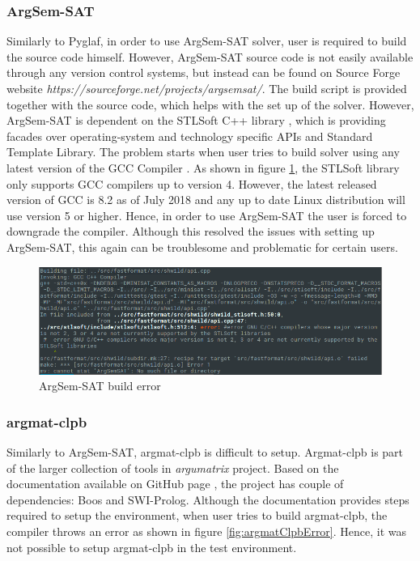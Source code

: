 \subsubsection{ArgSem-SAT}
Similarly to Pyglaf, in order to use ArgSem-SAT solver, user is required to build the source code himself. However, ArgSem-SAT source code is not easily available through any version control systems, but instead can be found on Source Forge website \textit{https://sourceforge.net/projects/argsemsat/}. The build script is provided together with the source code, which helps with the set up of the solver. However, ArgSem-SAT is dependent on the STLSoft C++ library \citep{stlsoft}, which is providing facades over operating-system and technology specific APIs and Standard Template Library. The problem starts when user tries to build solver using any latest version of the GCC Compiler \citep{gcc}. As shown in figure \ref{fig:argsemsatBuildError}, the STLSoft library only supports GCC compilers up to version 4. However, the latest released version of GCC is 8.2 as of July 2018 \citep{gcc} and any up to date Linux distribution will use version 5 or higher. Hence, in order to use ArgSem-SAT the user is forced to downgrade the compiler. Although this resolved the issues with setting up ArgSem-SAT, this again can be troublesome and problematic for certain users.

\begin{figure}[h]
	\centering
	\includegraphics[width=\linewidth]{"img/argsemsat_error"}
	\caption{ArgSem-SAT build error}
	\label{fig:argsemsatBuildError}
\end{figure}

\subsubsection{argmat-clpb}
Similarly to ArgSem-SAT, argmat-clpb \citep{argmat-clpb} is difficult to setup. Argmat-clpb is part of the larger collection of tools in \textit{argumatrix} project. Based on the documentation available on GitHub page \citep{argmat-clpbGithub}, the project has couple of dependencies: Boos and SWI-Prolog. Although the documentation provides steps required to setup the environment, when user tries to build argmat-clpb, the compiler throws an error as shown in figure \ref{fig:argmatClpbError}. Hence, it was not possible to setup argmat-clpb in the test environment.

